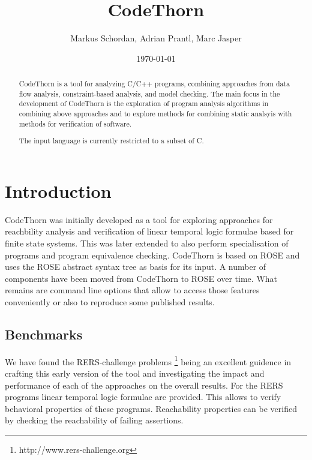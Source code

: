 \documentclass[natbib]{article}
\begin{document}
\title{CodeThorn}

\author{\small Markus Schordan, Adrian Prantl, Marc Jasper}
\date{\today}

\maketitle

\begin{abstract}

CodeThorn is a tool for analyzing C/C++ programs, combining approaches
from data flow analysis, constraint-based analysis, and model
checking. The main focus in the development of CodeThorn is the
exploration of program analysis algorithms in combining above
approaches and to explore methods for combining static analsyis with
methods for verification of software.

The input language is currently restricted to a subset of C.

\end{abstract}


\section{Introduction}
\label{sec:intro}

CodeThorn was initially developed as a tool for exploring approaches
for reachbility analysis and verification of linear temporal logic
formulae based for finite state systems. This was later extended to
also perform specialisation of programs and program equivalence
checking. CodeThorn is based on ROSE \cite{roseWWW} and uses the ROSE abstract syntax
tree as basis for its input. A number of components have been moved
from CodeThorn to ROSE over time. What remains are command line
options that allow to access those features conveniently or also to
reproduce some published results.

\subsection{Benchmarks}

We have found the RERS-challenge
problems \footnote{http://www.rers-challenge.org} being an excellent
guidence in crafting this early version of the tool and investigating
the impact and performance of each of the approaches on the overall
results. For the RERS programs linear temporal logic formulae are
provided. This allows to verify behavioral properties of these
programs. Reachability properties can be verified by checking the
reachability of failing assertions.
\end{document}
